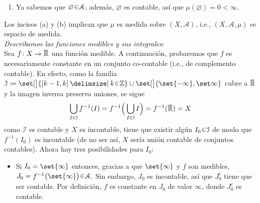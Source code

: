 \begin{sol}
\begin{enumerate}[label=(\alph*)]
\begin{itemize}
    \item Si existe $k\en\mathbb{N}$ tal que $A_k$ es incontable, ya vimos que $A^c_k$ y $\big(\bigcup^\infty_{i=1}A_i\big)^c$ son contables, de donde se sigue que $\mu\big(\bigcup^\infty_{i=1}A_i\big)=\mu(A_k)=1$. Por otro lado, como los $A_i$ son disjuntos a pares, tenemos que $A_i \cap A_k = \varnothing$ para cualquier $i \en \mathbb{N}\setminus\set{k}$, es decir, $A_i \subseteq A_k^c$ siempre que $i \en \mathbb{N}\setminus\set{k}$. Como $A_k^c$ es contable, esto último implica que forzosamente $A_i$ es contable para cada $i \en \mathbb{N}\setminus\set{k}$, así que $\mu(A_i) = 0$ para todo $i \en \mathbb{N}\setminus\set{k}$. Hemos probado $\mu(A_i) = \delta_{i,k}$, donde $\delta_{i,k}$ es la delta de Kronecker, por tanto:
    \[
    \mu\Big( \bigcup^\infty_{i=1}A_i \Big) = 1 = \sum^\infty_{i=1} \delta_{i,k} = \sum^\infty_{i=1}\mu(A_i)
    \]
\end{itemize}
En cualquier caso, hemos probado que $\mu(\bigcup^\infty_{i=1}A_i) = \sum^\infty_{i=1}\mu(A_i)$.

\item Ya sabemos que $\varnothing\en\mathcal{A}$; además, $\varnothing$ es contable, así que $\mu(\varnothing) = 0 < \infty$.
\end{enumerate}
Los incisos (a) y (b) implican que $\mu$ es medida sobre $(X,\mathcal{A})$, i.e., $(X,\mathcal{A},\mu)$ es espacio de medida.\vspace{1em}\\
\emph{Describamos las funciones medibles y sus integrales}:\\
Sea $f \colon X \to \ubar{\mathbb{R}}$ una función medible. A continuación, probaremos que $f$ es necesariamente constante en un conjunto co-contable (i.e., de complemento contable). En efecto, como la familia $\mathcal{I} \coloneq \set[\big]{[k-1,k] \given k\en\mathbb{Z}} \cup \set[\big]{\set{-\infty},\set\infty}$ cubre a $\ubar{\mathbb{R}}$ y la imagen inversa preserva uniones, se sigue
\[
\bigcup_{I\en\mathcal{I}} f^{-1}(I) = f^{-1}\Big(\bigcup_{I\en\mathcal{I}} I\Big) = f^{-1}(\ubar{\mathbb{R}}) = X
\]
como $\mathcal{I}$ es contable y $X$ es incontable, tiene que existir algún $I_0\en\mathcal{I}$ de modo que $f^{-1}(I_0)$ es incontable (de no ser así, $X$ sería unión contable de conjuntos contables). Ahora hay tres posibilidades para $I_0$:
\begin{itemize}
\item Si $I_0 = \set{\infty}$ entonces, gracias a que $\set{\infty}$ y $f$ son medibles, $J_0 = f^{-1}\big(\set{\infty}\big)\en\mathcal{A}$. Sin embargo, $J_0$ es incontable, así que $J_0^c$ tiene que ser contable. Por definición, $f$ es constante en $J_0$ de valor $\infty$, donde $J^c_0$ es contable.


\end{itemize}
\end{sol}
